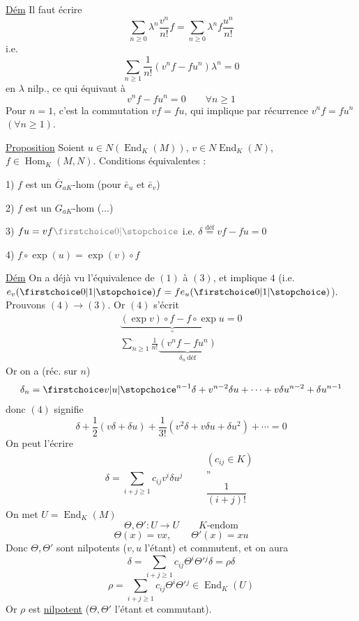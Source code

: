 \uline{Dém} Il faut écrire
\[
\sum_{n\geq0}\lambda^n\frac{v^n}{n!}f=\sum_{n\geq0}\lambda^n f\frac{u^n}{n!}
\]
i.e.
\[
\sum_{n\geq1}\frac1{n!}(v^nf-fu^n)\lambda^n=0
\]
 en $\lambda$ nilp., ce qui équivaut à
\[
v^nf-fu^n=0\qquad\forall n\geq1
\]
Pour $n=1$, c'est la commutation $vf=fu$, qui implique par récurrence $v^nf=fu^n$ $(\forall n\geq1)$.

\uline{Proposition} Soient  $u\in N(\operatorname{End}_K(M))$, $v\in N\operatorname{End}_K(N)$, $f\in\operatorname{Hom}_K(M,N)$. Conditions équivalentes :

1) $f$ est un $\overline G_{aK}$-hom (pour  $\bar e_u$ et $\bar e_v$)

2) $f$ est un $G_{aK}$-hom ($\ldots$)

3) $fu=vf\deleted{\unsure{0}}$ i.e. $\delta\overset{\mathrm{déf}}=vf-fu=0$

4) $f\circ\exp(u)=\exp(v)\circ f$

\uline{Dém} On a déjà vu l'équivalence de $(1)$ à $(3)$, et   implique $4$ (i.e. $e_v(\unsure{0|1})f=fe_u(\unsure{0|1})$). Prouvons $(4)\longrightarrow(3)$. Or $(4)$ s'écrit
\[
\begin{gathered}
\underbrace{(\exp v)\circ f-f\circ\exp u}_{\text{''}}=0\\
\sum_{n\geq1}\frac1{n!}\underbrace{(v^nf-fu^n)}_{\delta_n\ \mathrm{déf}}
\end{gathered}
\]
Or on a (réc. sur $n$)
\[
\delta_n=\unsure{v|u}^{n-1}\delta+v^{n-2}\delta u+\cdots+v\delta u^{n-2}+\delta u^{n-1}
\]
donc $(4)$ signifie
\[
\delta+\frac12(v\delta+\delta u)+\frac1{3!}(v^2\delta+v\delta u+\delta u^2)+\cdots=0
\]
On peut l'écrire
\[
\delta=\sum_{i+j\geq1}c_{ij}v^i\delta u^j
\qquad\begin{array}{c}(c_{ij}\in K)\\\text{''}\\\dfrac1{(i+j)!}\end{array}
\]
On met $U=\operatorname{End}_K(M)$
\[
\Theta,\Theta':U\longrightarrow U\qquad K\text{-endom}
\]
\[
\Theta(x)=vx,\qquad\Theta'(x)=xu
\]
Donc $\Theta,\Theta'$ sont nilpotents ($v,u$ l'étant) et commutent, et on aura
\[
\delta=\sum_{i+j\geq1}c_{ij}\Theta^i\Theta'{}^j\delta=\rho\delta
\]
\[
\rho=\sum_{i+j\geq1}c_{ij}\Theta^i\Theta'{}^j\in\operatorname{End}_K(U)
\]
Or $\rho$ est \uline{nilpotent} ($\Theta,\Theta'$ l'étant et commutant).

